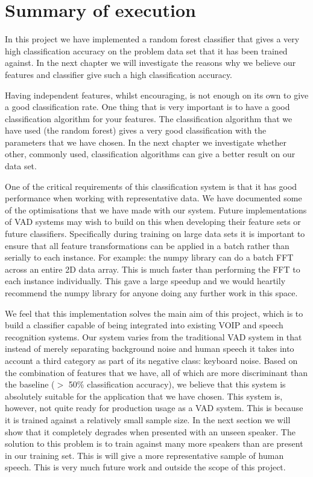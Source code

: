 \documentclass[ %
                    author={Sam Phippen},
                supervisor={Dr. Rafal Bogacz},
                     title={Real time voice activity detectors in noisy personal computing environments},
                  subtitle={},
                    degree={MEng},
                      year={2012} ]{thesis}
\begin{document}
\section{Summary of execution}

In this project we have implemented a random forest classifier that gives a
very high classification accuracy on the problem data set that it has been
trained against. In the next chapter we will investigate the reasons why we
believe our features and classifier give such a high classification accuracy.

Having independent features, whilst encouraging, is not enough on its own to
give a good classification rate. One thing that is very important is to have a
good classification algorithm for your features. The classification algorithm
that we have used (the random forest) gives a very good classification with the
parameters that we have chosen. In the next chapter we investigate whether
other, commonly used, classification algorithms can give a better result on our
data set.

One of the critical requirements of this classification system is that it has
good performance when working with representative data. We have documented some
of the optimisations that we have made with our system. Future implementations
of VAD systems may wish to build on this when developing their feature sets or
future classifiers. Specifically during training on large data sets it is
important to ensure that all feature transformations can be applied in a batch
rather than serially to each instance. For example: the numpy library can do a
batch FFT across an entire 2D data array. This is much faster than performing
the FFT to each instance individually. This gave a large speedup and we would
heartily recommend the numpy library for anyone doing any further work in this
space.

We feel that this implementation solves the main aim of this project, which is
to build a classifier capable of being integrated into existing VOIP and speech
recognition systems. Our system varies from the traditional VAD system in that
instead of merely separating background noise and human speech it takes into
account a third category as part of its negative class: keyboard noise.  Based
on the combination of features that we have, all of which are more discriminant
than the baseline ($>$ 50\% classification accuracy), we believe that this
system is absolutely suitable for the application that we have chosen.  This
system is, however, not quite ready for production usage as a VAD system. This
is because it is trained against a relatively small sample size. In the next
section we will show that it completely degrades when presented with an unseen
speaker. The solution to this problem is to train against many more speakers
than are present in our training set. This is will give a more representative
sample of human speech. This is very much future work and outside the scope of
this project.
\end{document}

